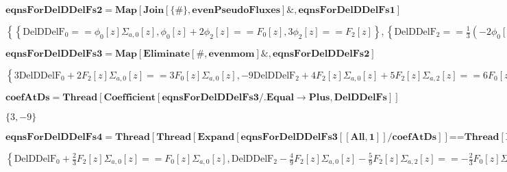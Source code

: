 \documentclass{article}
\begin{document}
\begin{doublespace}
\noindent\(\pmb{\text{eqnsForDelDDelFs2}=\text{Map}[\text{Join}[\{\#\},\text{evenPseudoFluxes}]\&,\text{eqnsForDelDDelFs1}]}\)
\end{doublespace}

\begin{doublespace}
\noindent\(\left\{\left\{\text{DelDDelF}_0==\phi _0[z] \Sigma _{a,0}[z],\phi _0[z]+2 \phi _2[z]==F_0[z],3 \phi _2[z]==F_2[z]\right\},\left\{\text{DelDDelF}_2==\frac{1}{3}
\left(-2 \phi _0[z] \Sigma _{a,0}[z]+5 \phi _2[z] \Sigma _{a,2}[z]\right),\phi _0[z]+2 \phi _2[z]==F_0[z],3 \phi _2[z]==F_2[z]\right\}\right\}\)
\end{doublespace}

\begin{doublespace}
\noindent\(\pmb{\text{eqnsForDelDDelFs3}=\text{Map}[\text{Eliminate}[\#,\text{evenmom}]\&,\text{eqnsForDelDDelFs2}]}\)
\end{doublespace}

\begin{doublespace}
\noindent\(\left\{3 \text{DelDDelF}_0+2 F_2[z] \Sigma _{a,0}[z]==3 F_0[z] \Sigma _{a,0}[z],-9 \text{DelDDelF}_2+4 F_2[z] \Sigma _{a,0}[z]+5 F_2[z]
\Sigma _{a,2}[z]==6 F_0[z] \Sigma _{a,0}[z]\right\}\)
\end{doublespace}

\begin{doublespace}
\noindent\(\pmb{\text{coefAtDs}=\text{Thread}[\text{Coefficient}[\text{eqnsForDelDDelFs3}\text{/.}\text{Equal}\to \text{Plus},\text{DelDDelFs}]]}\)
\end{doublespace}

\begin{doublespace}
\noindent\(\{3,-9\}\)
\end{doublespace}

\begin{doublespace}
\noindent\(\pmb{\text{eqnsForDelDDelFs4}=\text{Thread}[\text{Thread}[\text{Expand}[\text{eqnsForDelDDelFs3}[[\text{All},1]]/\text{coefAtDs}]]\text{==}\text{Thread}[\text{Expand}[\text{eqnsForDelDDelFs3}[[\text{All},2]]/\text{coefAtDs}]]]}\)
\end{doublespace}

\begin{doublespace}
\noindent\(\left\{\text{DelDDelF}_0+\frac{2}{3} F_2[z] \Sigma _{a,0}[z]==F_0[z] \Sigma _{a,0}[z],\text{DelDDelF}_2-\frac{4}{9} F_2[z] \Sigma _{a,0}[z]-\frac{5}{9}
F_2[z] \Sigma _{a,2}[z]==-\frac{2}{3} F_0[z] \Sigma _{a,0}[z]\right\}\)
\end{doublespace}
\end{document}
